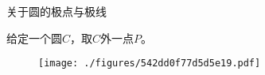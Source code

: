 





\begin{definition}{关于圆的极点与极线}

给定一个圆$C$，取$C$外一点$P$。

\begin{figure}[ht]
\centering
\texttt{[image: ./figures/542dd0f77d5d5e19.pdf]}
\caption{} \label{fig_EclPol_1}
\end{figure}

\end{definition}



























